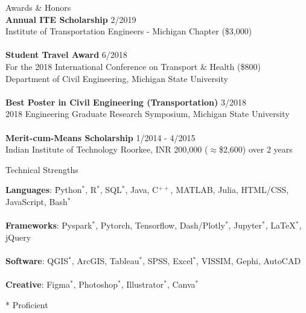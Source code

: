 \documentclass{CV} %
\begin{document}
\begin{rSection}{Awards \& Honors}
    \\ \textbf{Annual ITE Scholarship} \hfill {2/2019}
    \\ Institute of Transportation Engineers - Michigan Chapter (\$3,000) \\
    \\ \textbf{Student Travel Award} \hfill {6/2018}
    \\ For the 2018 International Conference on Transport \& Health (\$800)
    \\ Department of Civil Engineering, Michigan State University \\
    \\ \textbf{Best Poster in Civil Engineering (Transportation)} \hfill{3/2018}
    \\ 2018 Engineering Graduate Research Symposium, Michigan State University \\
    \\ \textbf{Merit-cum-Means Scholarship} \hfill{1/2014 - 4/2015}
    \\ Indian Institute of Technology Roorkee, INR 200,000 ($\approx$\$2,600) over 2 years
\end{rSection}

\begin{rSection}{Technical Strengths}
    \begin{tabbing}
    \textbf{Languages}: \hspace*{0.5cm} \= Python$^*$, R$^*$, SQL$^*$, Java, C$^{++}$, MATLAB, Julia, HTML/CSS, JavaScript, Bash$^*$ \\
    \\ \textbf{Frameworks}: \> Pyspark$^*$, Pytorch, Tensorflow, Dash/Plotly$^*$, Jupyter$^*$, LaTeX$^*$, jQuery \\
    \\ \textbf{Software}: \> QGIS$^*$, ArcGIS, Tableau$^*$, SPSS, Excel$^*$, VISSIM, Gephi, AutoCAD \\
    \\ \textbf{Creative}: \> Figma$^*$, Photoshop$^*$, Illustrator$^*$, Canva$^*$
    \end{tabbing}
    * Proficient
\end{rSection}
\end{document}
